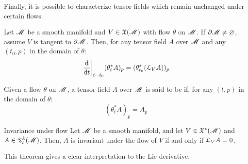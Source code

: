 Finally, it is possible to characterize tensor fields which remain unchanged under certain flows.

\begin{proposition}{}{}
  Let $ \mathscr{M} $ be a smooth manifold and $ V \in \mathfrak{X}(\mathscr{M}) $ with flow $ \theta $ on $ \mathscr{M} $. If $ \partial \mathscr{M} \neq \varnothing $, assume $ V $ is tangent to $ \partial \mathscr{M} $. Then, for any tensor field $ A $ over $ \mathscr{M} $ and any $ (t_0 , p) $ in the domain of $ \theta $:
  \begin{equation}
    \frac{\mathrm{d}}{\mathrm{d} t} \bigg\vert_{t = t_0} (\theta_t^* A)_p = (\theta_{t_0}^* (\EuScript{L}_V A))_p
    \label{eq:tens-flow-aux}
  \end{equation}
\end{proposition}

Given a flow $ \theta $ on $ \mathscr{M} $, a tensor field $ A $ over $ \mathscr{M} $ is said to be  if, for any $ (t,p) $ in the domain of $ \theta $:
\begin{equation*}
  (\theta_t^* A)_p = A_p
\end{equation*}

\begin{theorem}{Invariance under flow}{}
  Let $ \mathscr{M} $ be a smooth manifold, and let $ V \in \mathfrak{X}^*(\mathscr{M}) $ and $ A \in \mathfrak{T}^{k}_{l}(\mathscr{M}) $. Then, $ A $ is invariant under the flow of $ V $ if and only if $ \EuScript{L}_V A = 0 $.
\end{theorem}

This theorem gives a clear interpretation to the Lie derivative.








